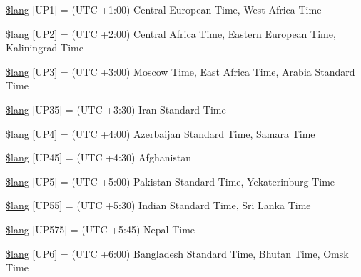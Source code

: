 \begin{DoxyCompactItemize}
\item 
\mbox{\hyperlink{date__lang_8php_affecc464623db3bf060bc5d1d8f3429d}{\$lang}} \mbox{[}\textquotesingle{}U\+P1\textquotesingle{}\mbox{]} = \textquotesingle{}(U\+TC +1\+:00) Central European Time, West Africa Time\textquotesingle{}
\item 
\mbox{\hyperlink{date__lang_8php_a8bc77502b4cc249f60b8af409ed7eef4}{\$lang}} \mbox{[}\textquotesingle{}U\+P2\textquotesingle{}\mbox{]} = \textquotesingle{}(U\+TC +2\+:00) Central Africa Time, Eastern European Time, Kaliningrad Time\textquotesingle{}
\item 
\mbox{\hyperlink{date__lang_8php_a6b687b37212f87cb83bfec9ce99278ea}{\$lang}} \mbox{[}\textquotesingle{}U\+P3\textquotesingle{}\mbox{]} = \textquotesingle{}(U\+TC +3\+:00) Moscow Time, East Africa Time, Arabia Standard Time\textquotesingle{}
\item 
\mbox{\hyperlink{date__lang_8php_a6259e0a44ef6649bb13ebcb168b24a49}{\$lang}} \mbox{[}\textquotesingle{}U\+P35\textquotesingle{}\mbox{]} = \textquotesingle{}(U\+TC +3\+:30) Iran Standard Time\textquotesingle{}
\item 
\mbox{\hyperlink{date__lang_8php_adedd69e7f22fc28d1305c4d52e128eec}{\$lang}} \mbox{[}\textquotesingle{}U\+P4\textquotesingle{}\mbox{]} = \textquotesingle{}(U\+TC +4\+:00) Azerbaijan Standard Time, Samara Time\textquotesingle{}
\item 
\mbox{\hyperlink{date__lang_8php_a5147073b93fc84c0aa1500b75a602a32}{\$lang}} \mbox{[}\textquotesingle{}U\+P45\textquotesingle{}\mbox{]} = \textquotesingle{}(U\+TC +4\+:30) Afghanistan\textquotesingle{}
\item 
\mbox{\hyperlink{date__lang_8php_aaa23c67ef8823dbe22e7adb7f33c0ded}{\$lang}} \mbox{[}\textquotesingle{}U\+P5\textquotesingle{}\mbox{]} = \textquotesingle{}(U\+TC +5\+:00) Pakistan Standard Time, Yekaterinburg Time\textquotesingle{}
\item 
\mbox{\hyperlink{date__lang_8php_a6aac0dc512351660e4a6b24912761d94}{\$lang}} \mbox{[}\textquotesingle{}U\+P55\textquotesingle{}\mbox{]} = \textquotesingle{}(U\+TC +5\+:30) Indian Standard Time, Sri Lanka Time\textquotesingle{}
\item 
\mbox{\hyperlink{date__lang_8php_a5afdabd1247533e38fdadc74871a669d}{\$lang}} \mbox{[}\textquotesingle{}U\+P575\textquotesingle{}\mbox{]} = \textquotesingle{}(U\+TC +5\+:45) Nepal Time\textquotesingle{}
\item 
\mbox{\hyperlink{date__lang_8php_a432eb6246d6f3a1f21232e80139c633a}{\$lang}} \mbox{[}\textquotesingle{}U\+P6\textquotesingle{}\mbox{]} = \textquotesingle{}(U\+TC +6\+:00) Bangladesh Standard Time, Bhutan Time, Omsk Time\textquotesingle{}

\end{DoxyCompactItemize}
